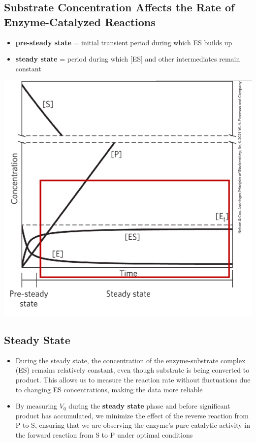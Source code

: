 \documentclass[10pt]{article}
\begin{document}
\subsection*{Substrate Concentration Affects the Rate of Enzyme-Catalyzed Reactions}
\begin{itemize}
    \item \textbf{pre-steady state} = initial transient period during which ES builds up
    \item \textbf{steady state} = period during which [ES] and other intermediates remain constant
\end{itemize}
\begin{center}
    
    \includegraphics*[scale=0.6]{L1_3.png}
\end{center}

\subsection*{Steady State}
\begin{itemize}
    \item During the steady state, the concentration of the enzyme-substrate complex (ES) remains relatively constant, even though substrate is being converted to product.  This allows us to measure the reaction rate without fluctuations due to changing ES concentrations, making the data more reliable
    \item By measuring $V_0$ during the \textbf{steady state} phase and before significant product has accumulated, we minimize the effect of the reverse reaction from P to S, ensuring that we are observing the enzyme's pure catalytic activity in the forward reaction from S to P under optimal conditions
\end{itemize}
\end{document}
